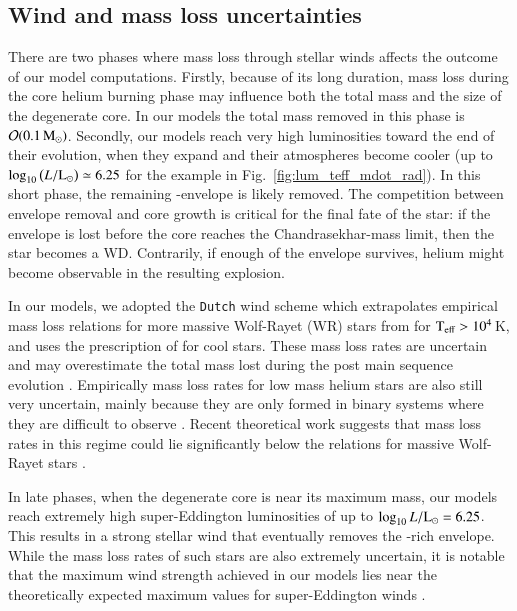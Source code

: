 \documentclass[main.tex]{subfiles}
\begin{document}
\subsection{Wind and mass loss uncertainties}\label{sec:ch2:series2_grid}
There are two phases where mass loss through stellar winds  affects the outcome of our model computations. Firstly, 
because of its long duration, mass loss during the core helium burning 
phase may influence both the total mass and the size of the degenerate core. In our  \seriesone models the total mass removed in this phase is $\mathcal{O}(0.1\mathrm{\,M_\odot})$. Secondly, our models reach very high 
luminosities toward the end of their evolution, when they expand and 
their atmospheres become cooler (up to $\log_{10} \left(L/{\rm L}_\odot \right) \simeq 6.25$ 
for the example in Fig.~\ref{fig:lum_teff_mdot_rad}). In this short phase, the 
remaining -envelope is likely removed. The competition between envelope removal and core growth is critical for the final fate of the
star: if the envelope is lost before the core reaches the Chandrasekhar-mass limit, then the star  becomes a WD. Contrarily, if enough of the envelope survives, helium might become observable in the resulting explosion.  

In our models, we adopted the \texttt{Dutch} \mesa wind scheme which  extrapolates empirical 
mass loss relations for more massive Wolf-Rayet (WR) stars from \cite{Nugis2000} for $\rm 
T_{\text{eff}} > 10^4$\,K, and uses the prescription of \cite{deJager1988} for cool stars. These 
mass loss rates are  uncertain and may  overestimate the total mass lost during the post main sequence evolution \citep{Beasor2021arx}. Empirically mass loss rates for low mass 
helium stars are also still very uncertain, mainly because they are only formed in binary systems where they are difficult to observe \citep{Smith2017,Zapartas2017}. Recent
theoretical work suggests that  mass loss rates in this regime could lie significantly below the relations for massive Wolf-Rayet stars \citep{Graefener2017,Vink:2017ujd}. 

In late phases, when the degenerate core is near its maximum mass, our models reach extremely high 
super-Eddington luminosities of up to $\log_{10}{L/{\rm L}_\odot = 6.25}$.
This results in a strong stellar wind that eventually removes the -rich envelope. While the mass loss rates of such stars are also extremely uncertain, it is notable that the maximum wind strength achieved in our models lies  near the theoretically expected maximum values for super-Eddington winds \citep[][]{Owocki:2004zz,Smith2006}. 
\end{document}
